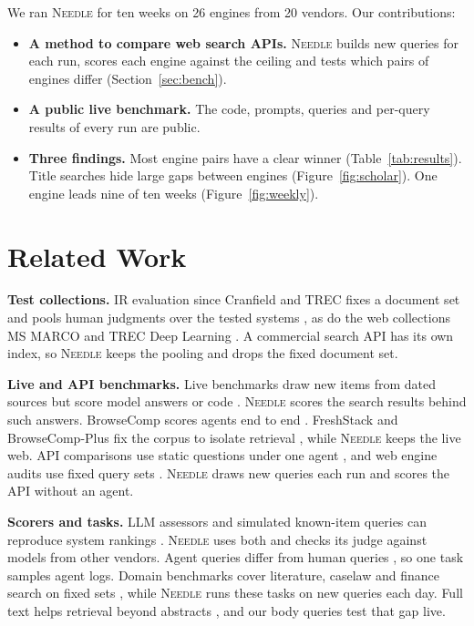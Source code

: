 \documentclass[11pt]{article}
\newcommand{\needle}{\textsc{Needle}\xspace}
\begin{document}
We ran \needle for ten weeks on 26 engines from 20 vendors. Our
contributions:
\begin{itemize}[nosep,leftmargin=1.2em]
\item \textbf{A method to compare web search APIs.} \needle builds new queries
  for each run, scores each engine against the ceiling and tests which
  pairs of engines differ (Section~\ref{sec:bench}).
\item \textbf{A public live benchmark.} The code, prompts, queries and
  per-query results of every run are public.
\item \textbf{Three findings.} Most engine pairs have a clear winner
  (Table~\ref{tab:results}). Title searches hide large gaps between
  engines (Figure~\ref{fig:scholar}). One engine leads nine of ten
  weeks (Figure~\ref{fig:weekly}).
\end{itemize}

\section{Related Work}
\label{sec:related}

\textbf{Test collections.} IR evaluation since Cranfield and TREC fixes
a document set and pools human judgments over the tested systems
\citep{sanderson2010test,voorhees2000variations}, as do the web
collections MS MARCO and TREC Deep Learning
\citep{bajaj2016msmarco,craswell2020trecdl}. A commercial search API has
its own index, so \needle keeps the pooling and drops the fixed
document set.

\textbf{Live and API benchmarks.} Live benchmarks draw new items from
dated sources but score model answers or code
\citep{white2025livebench,jain2025livecodebench,zhang2025swebenchlive,zhou2026livesearchbench}. \needle scores the
search results behind such answers. BrowseComp scores agents end to end
\citep{wei2025browsecomp}. FreshStack and BrowseComp-Plus fix the corpus
to isolate retrieval \citep{thakur2025freshstack,chen2026browsecompplus},
while \needle keeps the live web. API comparisons use static questions
under one agent \citep{selvam2026search,aa2026searchindex}, and web
engine audits use fixed query sets
\citep{lewandowski2015evaluating,kirsten2026characterizing}. \needle
draws new queries each run and scores the API without an agent.

\textbf{Scorers and tasks.} LLM assessors and simulated known-item queries
can reproduce system rankings
\citep{thomas2024llms,upadhyay2025largescale,azzopardi2007simulated,he2025totelicitation}.
\needle uses both and checks its judge against models from other vendors.
Agent queries differ from human queries
\citep{ning2026agentic,pezzuti2026picture}, so one task samples agent
logs.
Domain benchmarks cover literature, caselaw and finance search on fixed
sets \citep{ajith2024litsearch,hou2025clerc,hu2026finsearchcomp}, while
\needle runs these tasks on new queries each day. Full text helps
retrieval beyond abstracts \citep{lin2009fulltext}, and our body queries
test that gap live.
\end{document}

